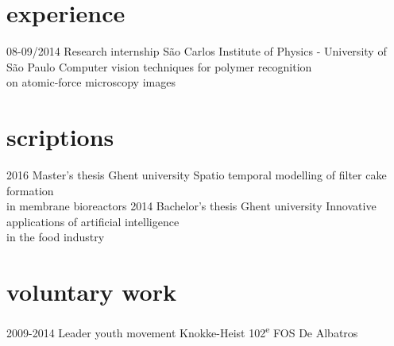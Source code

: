\documentclass[]{friggeri-cv}
\begin{document}
\section{experience}

\begin{entrylist}
  \entry
    {08-09/2014}
    {Research internship}
    {S\~{a}o Carlos Institute of Physics - University of S\~{a}o Paulo}
    {Computer vision techniques for polymer recognition\\ on atomic-force microscopy images}
\end{entrylist}

\section{scriptions}

\begin{entrylist}
  \entry
    {2016}
    {Master's thesis}
    {Ghent university}
    {Spatio temporal modelling of filter cake formation\\ in membrane bioreactors}
  \entry
    {2014}
    {Bachelor's thesis}
    {Ghent university}
    {Innovative applications of artificial intelligence\\ in the food industry}
\end{entrylist}

\section{voluntary work}
\begin{entrylist}
 \entry
    {2009-2014}
    {Leader youth movement}
    {Knokke-Heist}
    {102\textsuperscript{e} FOS De Albatros}
\end{entrylist} 
\end{document}
